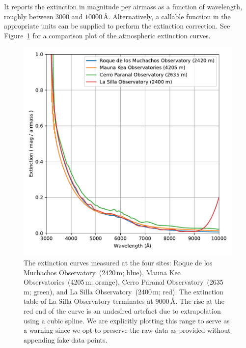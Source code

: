 \documentclass[twocolumn, linenumbers]{aastex631}
\begin{document}
It reports the extinction in magnitude per airmass as a
function of wavelength, roughly between $3000$ and $10000$\,\AA.
Alternatively, a callable function in the appropriate units can be
supplied to perform the extinction correction. See Figure~\ref{fig:extinction}
for a comparison plot of the atmospheric extinction curves.

\begin{figure}
    \centering
    \includegraphics[width=\columnwidth]{fig_07_extinction_curves.pdf}
    \caption{The extinction curves measured at the four sites: Roque de los Muchachos
    Observatory~(2420\,m; blue), Mauna Kea Observatories~(4205\,m; orange),
    Cerro Paranal Observatory~(2635\,m; green), and La Silla Observatory~(2400\,m; red).
    The extinction table of La Silla Observatory terminates at $9000$\,\AA. The rise at
    the red end of the curve is an undesired artefact due to extrapolation using a
    cubic spline. We are explicitly plotting this range to serve as a warning since we
    opt to preserve the raw data as provided without appending fake data points.}
    \label{fig:extinction}
\end{figure}
\end{document}
